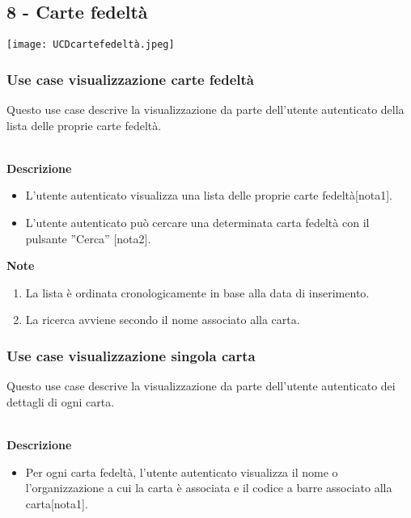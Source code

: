 \documentclass[a4paper,12pt]{article}
\begin{document}
\subsection*{8 - Carte fedeltà}

\begin{center}
  \texttt{[image: UCDcartefedeltà.jpeg]}
\end{center}

\subsubsection*{Use case visualizzazione carte fedeltà}

Questo use case descrive la visualizzazione da parte dell'utente autenticato della lista delle proprie carte fedeltà.

\textbf{\\Descrizione}
\begin{itemize} \setlength\itemsep{0.01em}
\item L'utente autenticato visualizza una lista delle proprie carte fedeltà[nota1].
\item L'utente autenticato può cercare una determinata carta fedeltà con il pulsante ''Cerca'' [nota2].
\end{itemize}

\textbf{Note}
\begin{enumerate} \setlength\itemsep{0.01em}
\item La lista è ordinata cronologicamente in base alla data di inserimento.
\item La ricerca avviene secondo il nome associato alla carta.
\end{enumerate}




\subsubsection*{Use case visualizzazione singola carta}

Questo use case descrive la visualizzazione da parte dell'utente autenticato dei dettagli di ogni carta.

\textbf{\\Descrizione}
\begin{itemize} \setlength\itemsep{0.01em}
\item Per ogni carta fedeltà, l'utente autenticato visualizza il nome o l'organizzazione a cui la carta è associata e il codice a barre associato alla carta[nota1].
\end{itemize}
\end{document}
